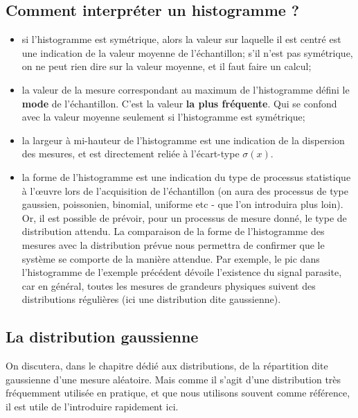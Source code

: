 \subsection{Comment interpréter un histogramme ?}

\begin{itemize}
\item si l'histogramme est symétrique, alors la valeur sur laquelle il est centré est une indication de la valeur moyenne de l'échantillon; s'il n'est pas symétrique, on ne peut rien dire sur la valeur moyenne, et il faut faire un calcul;
\item la valeur de la mesure correspondant au maximum de l'histogramme défini le \textbf{mode} de l'échantillon. C'est la valeur \textbf{la plus fréquente}. Qui se confond avec la valeur moyenne seulement si l'histogramme est symétrique;
\item la largeur à mi-hauteur de l'histogramme est une indication de la dispersion des mesures, et est directement reliée à l'écart-type $\sigma(x)$.
\item la forme de l'histogramme est une indication du type de processus statistique à l'\oe uvre lors de l'acquisition de l'échantillon (on aura des processus de type gaussien, poissonien, binomial, uniforme etc - que l'on introduira plus loin). Or, il est possible de prévoir, pour un processus de mesure donné, le type de distribution attendu. La comparaison de la forme de l'histogramme des mesures avec la distribution prévue nous permettra de confirmer que le système se comporte de la manière attendue. Par exemple, le pic dans l'histogramme de l'exemple précédent dévoile l'existence du signal parasite, car en général, toutes les mesures de grandeurs physiques suivent des distributions régulières (ici une distribution dite gaussienne).
\end{itemize}

\subsection{La distribution gaussienne}

On discutera, dans le chapitre dédié aux distributions, de la répartition dite gaussienne d'une mesure aléatoire. Mais comme il s'agit d'une distribution très fréquemment utilisée en pratique, et que nous utilisons souvent comme référence, il est utile de l'introduire rapidement ici.

